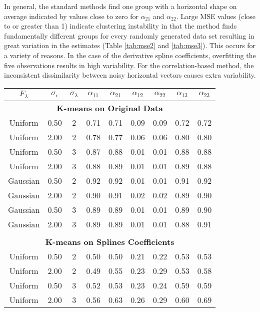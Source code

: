  In general, the standard methods find one group with a horizontal shape on average indicated by values close to zero for $\alpha_{21}$ and $\alpha_{22}$. Large MSE values (close to or greater than 1) indicate clustering instability in that the method finds fundamentally different groups for every randomly generated data set resulting in great variation in the estimates (Table \ref{tab:mse2} and \ref{tab:mse3}). This occurs for a variety of reasons. In the case of the derivative spline coefficients, overfitting the five observations results in high variability. For the correlation-based method, the inconsistent dissimilarity between noisy horizontal vectors causes extra variability.

\begin{table}[ht]
\centering
\begin{tabular}{ccc|cccccc}
  \thickhline $F_{\lambda}$&$\sigma_{\epsilon}$&$\sigma_{\lambda}$&$\alpha_{11}$&$\alpha_{21}$&$\alpha_{12}$&$\alpha_{22}$&$\alpha_{13}$&$\alpha_{23}$\\ \hline\multicolumn{9}{c}{\textbf{K-means on Original Data}}\\ Uniform & 0.50 &   2 & 0.71 & 0.71 & 0.09 & 0.09 & 0.72 & 0.72 \\ 
  Uniform & 2.00 &   2 & 0.78 & 0.77 & 0.06 & 0.06 & 0.80 & 0.80 \\ 
  Uniform & 0.50 &   3 & 0.87 & 0.88 & 0.01 & 0.01 & 0.88 & 0.88 \\ 
  Uniform & 2.00 &   3 & 0.88 & 0.89 & 0.01 & 0.01 & 0.89 & 0.88 \\ 
  Gaussian & 0.50 &   2 & 0.92 & 0.92 & 0.01 & 0.01 & 0.91 & 0.92 \\ 
  Gaussian & 2.00 &   2 & 0.90 & 0.91 & 0.02 & 0.02 & 0.89 & 0.90 \\ 
  Gaussian & 0.50 &   3 & 0.89 & 0.89 & 0.01 & 0.01 & 0.89 & 0.90 \\ 
  Gaussian & 2.00 &   3 & 0.89 & 0.89 & 0.01 & 0.01 & 0.88 & 0.91 \\ 
   \\ \multicolumn{9}{c}{\textbf{K-means on Splines Coefficients}}\\Uniform & 0.50 &   2 & 0.50 & 0.50 & 0.21 & 0.22 & 0.53 & 0.53 \\ 
  Uniform & 2.00 &   2 & 0.49 & 0.55 & 0.23 & 0.29 & 0.53 & 0.58 \\ 
  Uniform & 0.50 &   3 & 0.52 & 0.53 & 0.23 & 0.24 & 0.59 & 0.59 \\ 
  Uniform & 2.00 &   3 & 0.56 & 0.63 & 0.26 & 0.29 & 0.60 & 0.69 \\ 

\end{tabular}
\end{table}
